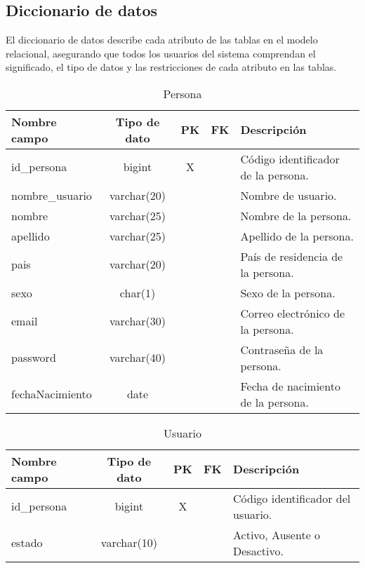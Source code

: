 \documentclass[12pt,a4paper]{article}
\begin{document}
\subsection{Diccionario de datos}
El diccionario de datos describe cada atributo de las tablas en el modelo relacional, asegurando que todos los usuarios del sistema comprendan el significado, el tipo de datos y las restricciones de cada atributo en las tablas.


\begin{table}[h!]
\centering
\begin{tabular}{|l|c|c|c|l|}
\hline
\textbf{Nombre campo}      & \textbf{Tipo de dato} & \textbf{PK} & \textbf{FK} & \textbf{Descripción} \\
\hline
id\_persona                & bigint                & X           &             & Código identificador de la persona. \\
nombre\_usuario            & varchar(20)           &             &             & Nombre de usuario. \\
nombre                     & varchar(25)           &             &             & Nombre de la persona. \\
apellido                   & varchar(25)           &             &             & Apellido de la persona. \\
pais                       & varchar(20)           &             &             & País de residencia de la persona. \\
sexo                       & char(1)               &             &             & Sexo de la persona. \\
email                      & varchar(30)           &             &             & Correo electrónico de la persona. \\
password                   & varchar(40)           &             &             & Contraseña de la persona. \\
fechaNacimiento            & date                  &             &             & Fecha de nacimiento de la persona. \\
\hline
\end{tabular}
\caption{Persona}
\label{table:persona}
\end{table}

\begin{table}[h!]
\centering
\begin{tabular}{|l|c|c|c|l|}
\hline
\textbf{Nombre campo}      & \textbf{Tipo de dato} & \textbf{PK} & \textbf{FK} & \textbf{Descripción} \\
\hline
id\_persona                & bigint                & X           &             & Código identificador del usuario. \\
estado                     & varchar(10)           &             &             & Activo, Ausente o Desactivo. \\
\hline
\end{tabular}
\caption{Usuario}
\label{table:usuario}
\end{table}
\end{document}
